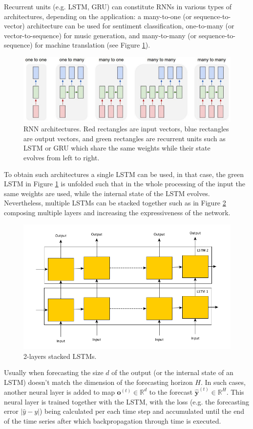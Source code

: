 \documentclass[a4paper, 12pt]{article} %
\begin{document}
	Recurrent units (e.g. LSTM, GRU) can constitute RNNs in various types of architectures, depending on the application: a many-to-one (or sequence-to-vector) architecture can be used for sentiment classification, one-to-many (or vector-to-sequence) for music generation, and many-to-many (or sequence-to-sequence) for machine translation (see Figure \ref{fig:rnn_architectures}).
	\begin{figure}
		\includegraphics[width=\linewidth]{img/rnn_architectures.png}
		\caption{RNN architectures. Red rectangles are input vectors, blue rectangles are output vectors, and green rectangles are recurrent units such as LSTM or GRU which share the same weights while their state evolves from left to right.}
		\label{fig:rnn_architectures}
	\end{figure}
	
	To obtain such architectures a single LSTM can be used, in that case, the green LSTM in Figure \ref{fig:rnn_architectures} is unfolded such that in the whole processing of the input the same weights are used, while the internal state of the LSTM evolves.	Nevertheless, multiple LSTMs can be stacked together such as in Figure \ref{fig:stacked_lstm} composing multiple layers and increasing the expressiveness of the network.
	\begin{figure}
		\includegraphics[width=\linewidth]{img/stacked_lstm.png}
		\caption{2-layers stacked LSTMs. }
		\label{fig:stacked_lstm}
	\end{figure}
	Usually when forecasting the size $d$ of the output (or the internal state of an LSTM) doesn't match the dimension of the forecasting horizon $H$. In such cases, another neural layer is added to map $\pmb{o}^{(t)} \in \mathbb{R}^d$ to the forecast $\hat{\pmb{y}}^{(t)} \in \mathbb{R}^H$. This neural layer is trained together with the LSTM, with the loss (e.g. the forecasting error $|\hat{y} - y|$) being calculated per each time step and accumulated until the end of the time series after which backpropagation through time is executed.
	
\end{document}
